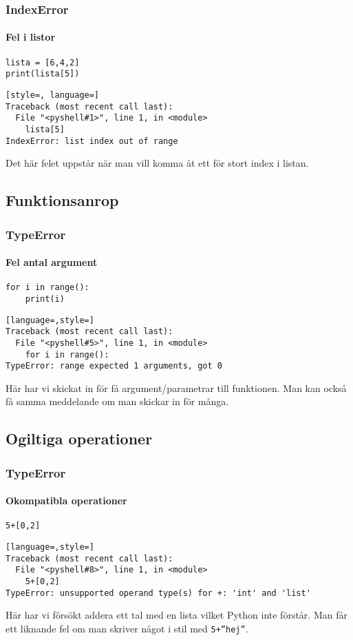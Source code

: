 \documentclass[aspectratio=169]{beamer}
\begin{document}
\begin{frame}[fragile]
\frametitle{IndexError}
\framesubtitle{Fel i listor}

\begin{lstlisting}
lista = [6,4,2]
print(lista[5])
\end{lstlisting}

\begin{lstlisting}[style=, language=]
Traceback (most recent call last):
  File "<pyshell#1>", line 1, in <module>
    lista[5]
IndexError: list index out of range
\end{lstlisting}

Det här felet uppstår när man vill komma åt ett för stort index i listan.

\end{frame}

\subsection{Funktionsanrop}

\begin{frame}[fragile]
\frametitle{TypeError}
\framesubtitle{Fel antal argument}

\begin{lstlisting}
for i in range():
    print(i)
\end{lstlisting}

\begin{lstlisting}[language=,style=]
Traceback (most recent call last):
  File "<pyshell#5>", line 1, in <module>
    for i in range():
TypeError: range expected 1 arguments, got 0
\end{lstlisting}

Här har vi skickat in för få argument/parametrar till funktionen. Man kan också få samma meddelande om man skickar in för många.

\end{frame}

\subsection{Ogiltiga operationer}

\begin{frame}[fragile]
\frametitle{TypeError}
\framesubtitle{Okompatibla operationer}

\begin{lstlisting}
5+[0,2]
\end{lstlisting}

\begin{lstlisting}[language=,style=]
Traceback (most recent call last):
  File "<pyshell#8>", line 1, in <module>
    5+[0,2]
TypeError: unsupported operand type(s) for +: 'int' and 'list'
\end{lstlisting}

Här har vi försökt addera ett tal med en lista vilket Python inte förstår. Man får ett liknande fel om man skriver något i stil med \texttt{5+''hej''}.

\end{frame}
\end{document}
